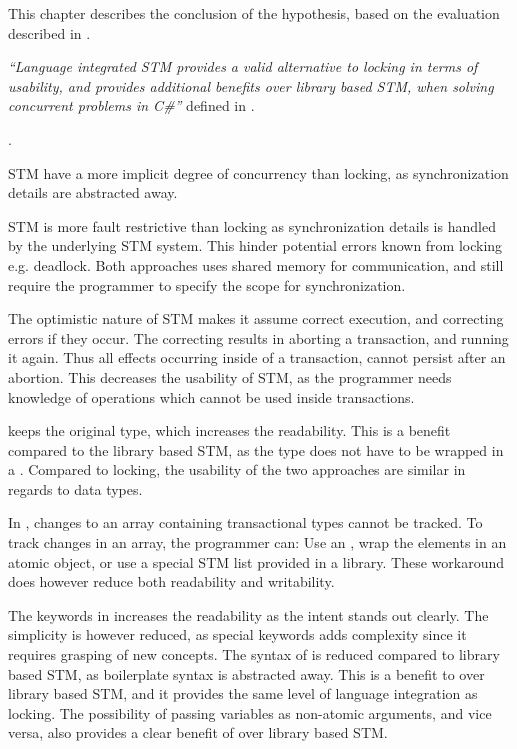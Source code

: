 \makeatletter {}\makeatother
{}
This chapter describes the conclusion of the hypothesis, based on the evaluation described in . 
\label{chap:conclusion}

\textit{``Language integrated \ac{STM} provides a valid alternative to locking in terms of usability, and provides additional benefits over library based \ac{STM}, when solving concurrent problems in C\#''} defined in .

.

\ac{STM} have a more implicit degree of concurrency than locking, as synchronization details are abstracted away.

\ac{STM} is more fault restrictive than locking as synchronization details is handled by the underlying \ac{STM} system. This hinder potential errors known from locking e.g. deadlock. Both approaches uses shared memory for communication, and still require the programmer to specify the scope for synchronization. 

The optimistic nature of \ac{STM} makes it assume correct execution, and correcting errors if they occur. The correcting results in aborting a transaction, and running it again. Thus all effects occurring inside of a transaction, cannot persist after an abortion. This decreases the usability of \ac{STM}, as the programmer needs knowledge of operations which cannot be used inside transactions.

\stmname keeps the original type, which increases the readability. This is a benefit compared to the library based \ac{STM}, as the type does not have to be wrapped in a . Compared to locking, the usability of the two approaches are similar in regards to data types. 

In \stmname, changes to an array containing transactional types cannot be tracked. To track changes in an array, the programmer can: Use an , wrap the elements in an atomic object, or use a special \ac{STM} list provided in a library. These workaround does however reduce both readability and writability. 

The keywords in \stmname increases the readability as the intent stands out clearly. The simplicity is however reduced, as special keywords adds complexity since it requires grasping of new concepts. The syntax of \stmname is reduced compared to library based \ac{STM}, as boilerplate syntax is abstracted away. This is a benefit to \stmname over library based \ac{STM}, and it provides the same level of language integration as locking. The possibility of passing  variables as non-atomic arguments, and vice versa, also provides a clear benefit of \stmname over library based \ac{STM}. 

